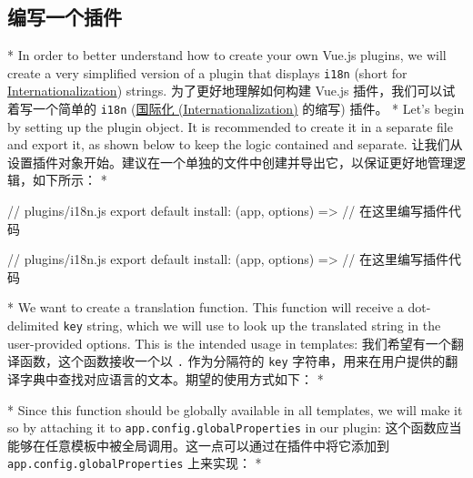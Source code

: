 \begin{paracol}{2}
\subsection{编写一个插件}
\switchcolumn[0]*%
In order to better understand how to create your own Vue.js plugins, we
will create a very simplified version of a plugin that displays
\texttt{i18n} (short for
\href{https://en.wikipedia.org/wiki/Internationalization_and_localization}{Internationalization})
strings.
\switchcolumn
为了更好地理解如何构建 Vue.js 插件，我们可以试着写一个简单的
\texttt{i18n}
(\href{https://en.wikipedia.org/wiki/Internationalization_and_localization}{国际化
(Internationalization)} 的缩写) 插件。 
\switchcolumn[0]*%
Let's begin by setting up the plugin object. It is recommended to create
it in a separate file and export it, as shown below to keep the logic
contained and separate.
\switchcolumn
让我们从设置插件对象开始。建议在一个单独的文件中创建并导出它，以保证更好地管理逻辑，如下所示：
\switchcolumn[0]*%
\begin{codeJs}
// plugins/i18n.js
export default {
  install: (app, options) => {
    // 在这里编写插件代码
  }
}
\end{codeJs}
\switchcolumn
\begin{codeJs}
// plugins/i18n.js
export default {
  install: (app, options) => {
    // 在这里编写插件代码
  }
}
\end{codeJs}
\switchcolumn[0]*%
We want to create a translation function. This function will receive a
dot-delimited \texttt{key} string, which we will use to look up the
translated string in the user-provided options. This is the intended
usage in templates:
\switchcolumn
我们希望有一个翻译函数，这个函数接收一个以 \texttt{.} 作为分隔符的
\texttt{key}
字符串，用来在用户提供的翻译字典中查找对应语言的文本。期望的使用方式如下：
\switchcolumn[0]*%
\switchcolumn
{}
\switchcolumn[0]*%
Since this function should be globally available in all templates, we
will make it so by attaching it to \texttt{app.config.globalProperties}
in our plugin:
\switchcolumn
这个函数应当能够在任意模板中被全局调用。这一点可以通过在插件中将它添加到
\texttt{app.config.globalProperties} 上来实现： 
\switchcolumn[0]*%
\begin{codeJs}

\end{codeJs}
\end{paracol}
